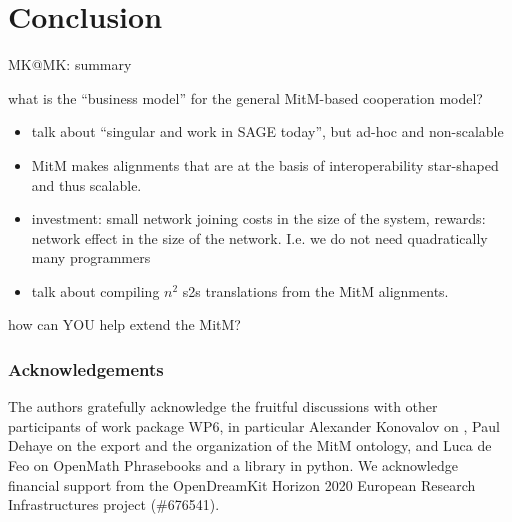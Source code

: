 \section{Conclusion}\label{sec:concl}
\begin{todolist}{MK@MK: summary}
\item what is the ``business model'' for the general MitM-based cooperation model?
  \begin{itemize}
  \item talk about ``singular and \GAP work in SAGE today'', but ad-hoc and non-scalable 
  \item MitM makes alignments that are at the basis of interoperability star-shaped and
    thus scalable.
  \item investment: small network joining costs in the size of the system, rewards:
    network effect in the size of the network. I.e. we do not need quadratically many
    programmers
  \item talk about compiling $n^2$ s2s translations from the MitM alignments. 
  \end{itemize}
\item how can YOU help extend the MitM?
\end{todolist}

\subsubsection*{Acknowledgements}
The authors gratefully acknowledge the fruitful discussions with other participants of
work package WP6, in particular Alexander Konovalov on \SCSCP, Paul Dehaye on the \Sage
export and the organization of the MitM ontology, and Luca de Feo on OpenMath Phrasebooks
and a \SCSCP library in python.  We acknowledge financial support from the OpenDreamKit
Horizon 2020 European Research Infrastructures project (\#676541).


